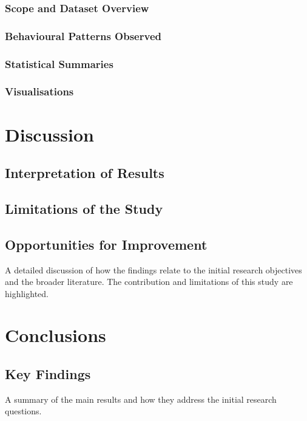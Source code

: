 \documentclass[a4paper,12pt]{report}
\begin{document}
\subsection{Scope and Dataset Overview}
\subsection{Behavioural Patterns Observed}
\subsection{Statistical Summaries}
\subsection{Visualisations}

\chapter{Discussion}

\section{Interpretation of Results}

\section{Limitations of the Study}

\section{Opportunities for Improvement}


A detailed discussion of how the findings relate to the initial research objectives and the broader literature. The contribution and limitations of this study are highlighted.

\chapter{Conclusions}

\section{Key Findings}
A summary of the main results and how they address the initial research questions.
\end{document}
